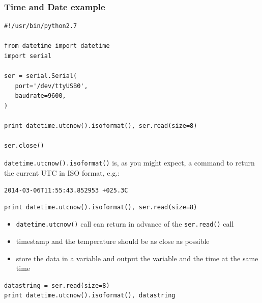 \documentclass[aspectratio=1610,9pt]{beamer} %
\begin{document}
\begin{frame}[fragile]
\frametitle{Time and Date example}

\begin{verbatim}
#!/usr/bin/python2.7

from datetime import datetime
import serial

ser = serial.Serial(
   port='/dev/ttyUSB0',
   baudrate=9600,
)

print datetime.utcnow().isoformat(), ser.read(size=8) 

ser.close()
\end{verbatim}

\texttt{datetime.utcnow().isoformat()} is, as you might expect, a
command to return the current UTC in ISO format, e.g.:

\texttt{2014-03-06T11:55:43.852953 +025.3C}

\begin{verbatim}
print datetime.utcnow().isoformat(), ser.read(size=8) 
\end{verbatim}

\begin{itemize}
\itemsep1pt\parskip0pt
\item
  \texttt{datetime.utcnow()} call can return in advance of the
  \texttt{ser.read()} call
\item
  timestamp and the temperature should be as close as possible
\item
  store the data in a variable and output the variable and the time at
  the same time
\end{itemize}

\begin{verbatim}
datastring = ser.read(size=8)
print datetime.utcnow().isoformat(), datastring
\end{verbatim}

\end{frame}
\end{document}
